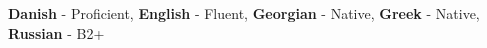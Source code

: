 \documentclass[9pt]{developercv} %
\begin{document}
\vspace{-10 pt}
    \vspace{-6pt}
    
    \hspace{26mm} \textbf{Danish} - Proficient, \textbf{English} - Fluent, \textbf{ Georgian} - Native, \textbf{Greek} - Native, \textbf{Russian} - B2+

\end{document}
